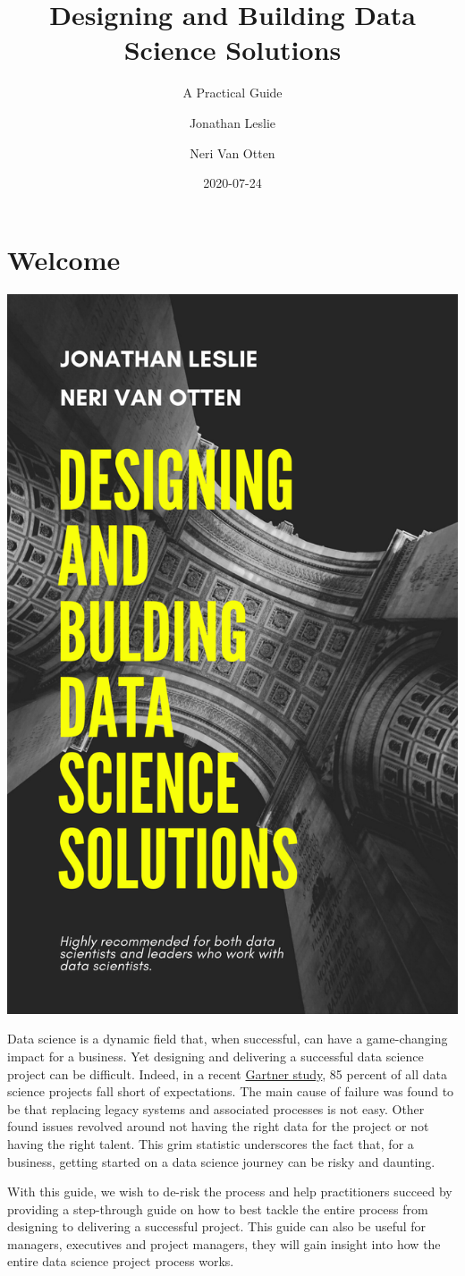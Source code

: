 \documentclass[
]{book}
\title{Designing and Building Data Science Solutions}
\subtitle{A Practical Guide}
\author{Jonathan Leslie \and Neri Van Otten}
\date{2020-07-24}
\begin{document}
\maketitle

{
\setcounter{tocdepth}{1}
\tableofcontents
}
\hypertarget{welcome}{%
\chapter*{Welcome}\label{welcome}}

\includegraphics[width=0.5\linewidth]{figures/Designing and bulding data science solutions}

Data science is a dynamic field that, when successful, can have a game-changing impact for a business. Yet designing and delivering a successful data science project can be difficult. Indeed, in a recent \href{https://www.gartner.com/en/newsroom/press-releases/2018-02-13-gartner-says-nearly-half-of-cios-are-planning-to-deploy-artificial-intelligence}{Gartner study}, 85 percent of all data science projects fall short of expectations. The main cause of failure was found to be that replacing legacy systems and associated processes is not easy. Other found issues revolved around not having the right data for the project or not having the right talent. This grim statistic underscores the fact that, for a business, getting started on a data science journey can be risky and daunting.

With this guide, we wish to de-risk the process and help practitioners succeed by providing a step-through guide on how to best tackle the entire process from designing to delivering a successful project. This guide can also be useful for managers, executives and project managers, they will gain insight into how the entire data science project process works.
\end{document}
